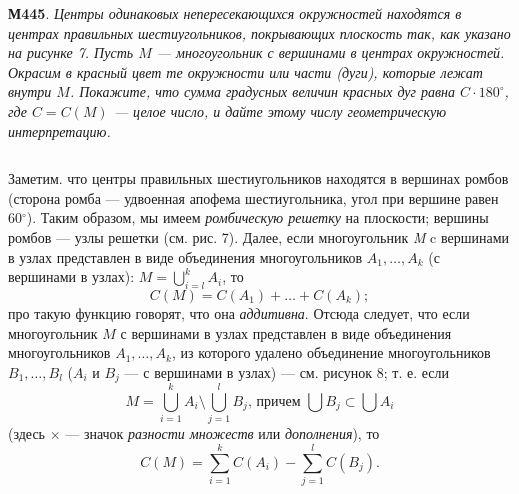     \begin{paracol}{2}
        \begin{column}
            \noindent
            \textbf{М445}. \textit{Центры одинаковых непересекающихся окружностей находятся в центрах правильных шестиугольников, покрывающих плоскость так, как указано на рисунке 7. 
            Пусть $M$ --- многоугольник с вершинами в центрах окружностей. 
            Окрасим в красный цвет те окружности или части (дуги), которые лежат внутри $M$. 
            Покажите, что сумма градусных величин красных дуг равна $C \cdot 180^{\circ}$, где $C = C(M)$ --- целое число, и дайте этому числу геометрическую интерпретацию.}
        \end{column}
        

        \begin{column}
            \noindent
            Заметим. что центры правильных шестиугольников находятся в вершинах ромбов (сторона ромба --- удвоенная апофема шестиугольника, угол при вершине равен 60$^{\circ}$). 
            Таким образом, мы имеем \textit{ромбическую решетку} на плоскости; 
            вершины ромбов --- узлы решетки (см. рис. 7). 
            Далее, если многоугольник \textit{M} c вершинами в узлах представлен в виде объединения многоугольников $A_1, \ldots, A_k$ (с вершинами в узлах): $M = \bigcup\limits_{i=l}^{k} A_{i}$, то
            \[ C(M) = C(A_1)+\ldots+C(A_k);\] 
            про такую функцию говорят, что она \textit{аддитивна}. 
            Отсюда следует, что если многоугольник $M$ с вершинами в узлах представлен в виде объединения многоугольников $A_1, \ldots, A_k$, из которого удалено объединение многоугольников $B_1, \ldots, B_l$ ($A_i$ и $B_j$ --- с вершинами в узлах) --- см. рисунок 8; т. е. если 
            \begin{equation} \tag{*} M = \bigcup\limits_{i=1}^{k} A_i \setminus \bigcup\limits_{j=1}^{l} B_j  \text{, причем } \bigcup B_j \subset \bigcup A_i\end{equation} 
            (здесь $\times$ --- значок \textit{разности множеств} или \textit{дополнения}), то \[C(M)=\sum_{i=1}^{k} C(A_i) - \sum_{j=1}^{l} C(B_j).\]
        \end{column}
    \end{paracol}

% 